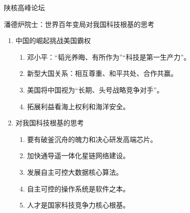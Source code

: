 \documentclass{ctexbeamer}
\begin{document}
\begin{frame}[standout]
    \huge 陕核高峰论坛
\end{frame}

\begin{frame}{潘德炉院士：世界百年变局对我国科技根基的思考}
    \begin{enumerate}
        \item 中国的崛起挑战美国霸权
        \begin{enumerate}
            \item 邓小平：“韬光养晦、有所作为”“科技是第一生产力”。
            \item 新型大国关系：相互尊重、和平共处、合作共赢。
            \item 美国将中国视为“长期、头号战略竞争对手”。
            \item 拓展利益看海上权利和海洋安全。
        \end{enumerate}
        \item 对我国科技根基的思考
        \begin{enumerate}
            \item 要有破釜沉舟的魄力和决心研发高端芯片。
            \item 加快通导遥一体化星链网络建设。
            \item 发展自主可控大数据核心算法。
            \item 自主可控的操作系统是软件之本。
            \item 人才是国家科技竞争力核心根基。
        \end{enumerate}
    \end{enumerate}
\end{frame}
\end{document}
